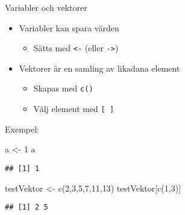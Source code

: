 \documentclass[
  10pt,
  ignorenonframetext,
]{beamer}
\newenvironment{Shaded}{\begin{snugshade}}{\end{snugshade}}
\newcommand{\DecValTok}[1]{\textcolor[rgb]{0.00,0.00,0.81}{#1}}
\newcommand{\FunctionTok}[1]{\textcolor[rgb]{0.00,0.00,0.00}{#1}}
\newcommand{\NormalTok}[1]{#1}
\newcommand{\OtherTok}[1]{\textcolor[rgb]{0.56,0.35,0.01}{#1}}
\providecommand{\tightlist}{%
  \setlength{\itemsep}{0pt}\setlength{\parskip}{0pt}}
\begin{document}
\begin{frame}[fragile]{Variabler och vektorer}
\protect\hypertarget{variabler-och-vektorer}{}
\begin{itemize}
\tightlist
\item
  Variabler kan spara värden

  \begin{itemize}
  \tightlist
  \item
    Sätts med \texttt{<-} (eller \texttt{->})
  \end{itemize}
\item
  Vektorer är en samling av likadana element

  \begin{itemize}
  \tightlist
  \item
    Skapas med \texttt{c()}
  \item
    Välj element med \texttt{[ ]}
  \end{itemize}
\end{itemize}

Exempel:

\begin{Shaded}
\begin{Highlighting}[]
\NormalTok{a }\OtherTok{\textless{}{-}} \DecValTok{1}
\NormalTok{a}
\end{Highlighting}
\end{Shaded}

\begin{verbatim}
## [1] 1
\end{verbatim}

\begin{Shaded}
\begin{Highlighting}[]
\NormalTok{testVektor }\OtherTok{\textless{}{-}} \FunctionTok{c}\NormalTok{(}\DecValTok{2}\NormalTok{,}\DecValTok{3}\NormalTok{,}\DecValTok{5}\NormalTok{,}\DecValTok{7}\NormalTok{,}\DecValTok{11}\NormalTok{,}\DecValTok{13}\NormalTok{)}
\NormalTok{testVektor[}\FunctionTok{c}\NormalTok{(}\DecValTok{1}\NormalTok{,}\DecValTok{3}\NormalTok{)]}
\end{Highlighting}
\end{Shaded}

\begin{verbatim}
## [1] 2 5
\end{verbatim}
\end{frame}

\end{document}
